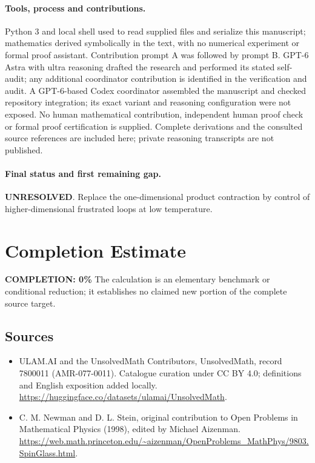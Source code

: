 \documentclass[11pt]{article}
\begin{document}
\paragraph{Tools, process and contributions.}
Python 3 and local shell used to read supplied files and serialize this manuscript; mathematics derived symbolically in the text, with no numerical experiment or formal proof assistant. Contribution prompt A was followed by prompt B. GPT-6 Astra with ultra reasoning drafted the research and performed its stated self-audit; any additional coordinator contribution is identified in the verification and audit. A GPT-6-based Codex coordinator assembled the manuscript and checked repository integration; its exact variant and reasoning configuration were not exposed. No human mathematical contribution, independent human proof check or formal proof certification is supplied. Complete derivations and the consulted source references are included here; private reasoning transcripts are not published.

\paragraph{Final status and first remaining gap.}
\textbf{UNRESOLVED}. Replace the one-dimensional product contraction by control of higher-dimensional frustrated loops at low temperature.

\section{Completion Estimate}
\noindent\textbf{COMPLETION: 0\%}
The calculation is an elementary benchmark or conditional reduction; it establishes no claimed new portion of the complete source target.

\subsection{Sources}
\begin{itemize}
\item[\hypertarget{source:7800011:1}{S1}] ULAM.AI and the UnsolvedMath Contributors, UnsolvedMath, record 7800011 (AMR-077-0011). Catalogue curation under CC BY 4.0; definitions and English exposition added locally.
\url{https://huggingface.co/datasets/ulamai/UnsolvedMath}.
\item[\hypertarget{source:7800011:2}{S2}] C. M. Newman and D. L. Stein, original contribution to Open Problems in Mathematical Physics (1998), edited by Michael Aizenman.
\url{https://web.math.princeton.edu/~aizenman/OpenProblems_MathPhys/9803.SpinGlass.html}.
\end{itemize}
\label{end:7800011}
\end{document}

